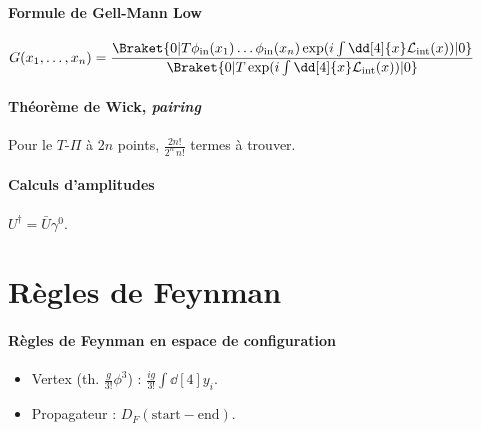 \documentclass{article}
\begin{document}
\paragraph{Formule de Gell-Mann Low} $\displaystyle
G(x_1,\dots,x_n) = \frac{\Braket{0|T\phi_\text{in}(x_1)\dots\phi_\text{in}(x_n)\exp(i\int\dd[4]{x}\mathcal{L}_\text{int}(x))|0}}{\Braket{0|T \exp(i\int\dd[4]{x}\mathcal{L}_\text{int}(x))|0}} $

\paragraph{Théorème de Wick, \emph{pairing}} Pour le $T\text{-}\Pi$ à $2n$ points, $\frac{2n!}{2^n\,n!}$ termes à trouver.

\paragraph{Calculs d'amplitudes} $U^\dagger = \bar{U}\gamma^0$.

\section{Règles de Feynman}

\paragraph{Règles de Feynman en espace de configuration}
\begin{itemize}
\item Vertex (th. $\frac{g}{3!}\phi^3$) : $\frac{ig}{3!}\int\dd[4]{y_i}$.
\item Propagateur : $D_F(\text{start}-\text{end})$.
\end{itemize}
\end{document}
